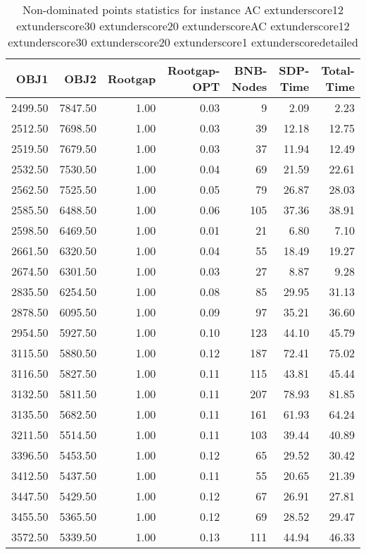 \begin{table}
\caption{Non-dominated points statistics for instance AC	extunderscore12	extunderscore30	extunderscore20	extunderscoreAC	extunderscore12	extunderscore30	extunderscore20	extunderscore1	extunderscoredetailed}
\label{tab:stats/AC_12_30_20_AC_12_30_20_1_detailed}
\begin{tabular}{rrrrrrr}
\toprule
OBJ1 & OBJ2 & Rootgap & Rootgap-OPT & BNB-Nodes & SDP-Time & Total-Time \\
\midrule
2499.50 & 7847.50 & 1.00 & 0.03 & 9 & 2.09 & 2.23 \\
2512.50 & 7698.50 & 1.00 & 0.03 & 39 & 12.18 & 12.75 \\
2519.50 & 7679.50 & 1.00 & 0.03 & 37 & 11.94 & 12.49 \\
2532.50 & 7530.50 & 1.00 & 0.04 & 69 & 21.59 & 22.61 \\
2562.50 & 7525.50 & 1.00 & 0.05 & 79 & 26.87 & 28.03 \\
2585.50 & 6488.50 & 1.00 & 0.06 & 105 & 37.36 & 38.91 \\
2598.50 & 6469.50 & 1.00 & 0.01 & 21 & 6.80 & 7.10 \\
2661.50 & 6320.50 & 1.00 & 0.04 & 55 & 18.49 & 19.27 \\
2674.50 & 6301.50 & 1.00 & 0.03 & 27 & 8.87 & 9.28 \\
2835.50 & 6254.50 & 1.00 & 0.08 & 85 & 29.95 & 31.13 \\
2878.50 & 6095.50 & 1.00 & 0.09 & 97 & 35.21 & 36.60 \\
2954.50 & 5927.50 & 1.00 & 0.10 & 123 & 44.10 & 45.79 \\
3115.50 & 5880.50 & 1.00 & 0.12 & 187 & 72.41 & 75.02 \\
3116.50 & 5827.50 & 1.00 & 0.11 & 115 & 43.81 & 45.44 \\
3132.50 & 5811.50 & 1.00 & 0.11 & 207 & 78.93 & 81.85 \\
3135.50 & 5682.50 & 1.00 & 0.11 & 161 & 61.93 & 64.24 \\
3211.50 & 5514.50 & 1.00 & 0.11 & 103 & 39.44 & 40.89 \\
3396.50 & 5453.50 & 1.00 & 0.12 & 65 & 29.52 & 30.42 \\
3412.50 & 5437.50 & 1.00 & 0.11 & 55 & 20.65 & 21.39 \\
3447.50 & 5429.50 & 1.00 & 0.12 & 67 & 26.91 & 27.81 \\
3455.50 & 5365.50 & 1.00 & 0.12 & 69 & 28.52 & 29.47 \\
3572.50 & 5339.50 & 1.00 & 0.13 & 111 & 44.94 & 46.33 \\

\end{tabular}
\end{table}
